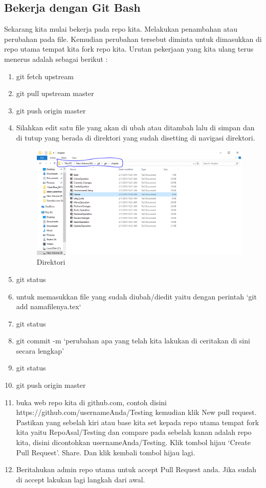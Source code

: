 \subsection{Bekerja dengan Git Bash}
Sekarang kita mulai bekerja pada repo kita. Melakukan penambahan atau perubahan pada file. Kemudian perubahan tersebut diminta untuk dimasukkan di repo utama tempat kita fork repo kita. Urutan pekerjaan yang kita ulang terus menerus adalah sebagai berikut :
\begin{enumerate}
\item git fetch upstream
\item git pull upstream master
\item git push origin master
\item Silahkan edit satu file yang akan di ubah atau ditambah lalu di simpan dan di tutup yang berada di direktori yang sudah disetting di navigasi direktori.
    \begin{figure}[!htbp]
        \centering
            \includegraphics[width=.5\textwidth]{Figures/Capture}
            \caption{Direktori}
        \label{penanda}
    \end{figure}
\item git status
\item untuk memasukkan file yang sudah diubah/diedit yaitu dengan perintah `git add namafilenya.tex`
\item git status
\item git commit -m `perubahan apa yang telah kita lakukan di ceritakan di sini secara lengkap'
\item git status
\item git push origin master
\item buka web repo kita di github.com, contoh disini https://github.com/usernameAnda/Testing kemudian klik New pull request. Pastikan yang sebelah kiri atau base kita set kepada repo utama tempat fork kita yaitu RepoAsal/Testing dan compare pada sebelah kanan adalah repo kita, disini dicontohkan usernameAnda/Testing. Klik tombol hijau `Create Pull Request'. Share. Dan klik kembali tombol hijau lagi.
\item Beritahukan admin repo utama untuk accept Pull Request anda. Jika sudah di accept lakukan lagi langkah dari awal.
\end{enumerate} 